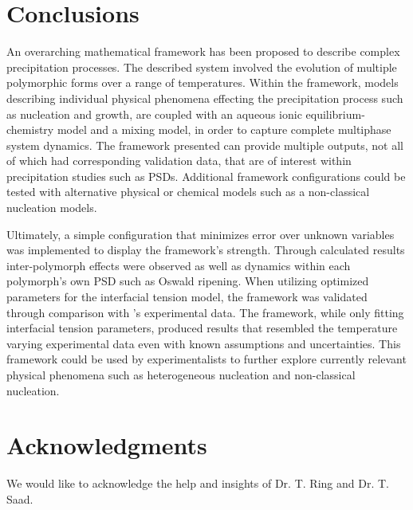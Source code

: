\documentclass[preprint,3p,a4paper,times,12pt,authoryear]{elsarticle}
\begin{document}
\section{Conclusions}
An overarching mathematical framework has been proposed to describe complex precipitation processes.  The described system involved the evolution of multiple polymorphic forms over a range of temperatures.  Within the framework, models describing individual physical phenomena effecting the precipitation process such as nucleation and growth, are coupled with an aqueous ionic equilibrium-chemistry model and a mixing model, in order to capture complete multiphase system dynamics.  The framework presented can provide multiple outputs, not all of which had corresponding validation data, that are of interest within precipitation studies such as PSDs.   Additional framework configurations could be tested with alternative physical or chemical models such as a non-classical nucleation models.  

Ultimately, a simple configuration that minimizes error over unknown variables was implemented to display the framework's strength.  Through calculated results inter-polymorph effects were observed as well as dynamics within each polymorph's own PSD such as Oswald ripening.  When utilizing optimized parameters for the interfacial tension model, the framework was validated through comparison with \citet{Ogino1987}'s experimental data.  The framework, while only fitting interfacial tension parameters, produced results that resembled the temperature varying experimental data even with known assumptions and uncertainties.  This framework could be used by experimentalists to further explore currently relevant physical phenomena such as heterogeneous nucleation and non-classical nucleation.

\section*{Acknowledgments}
We would like to acknowledge the help and insights of Dr. T. Ring and Dr. T. Saad.


\end{document}
